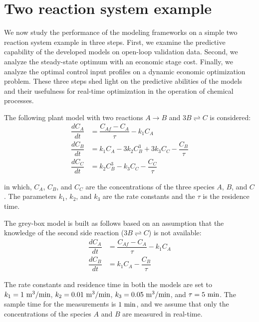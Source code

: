 \documentclass[10pt]{article}
\begin{document}
\section{Two reaction system example}

We now study the performance of the modeling frameworks on a simple two
reaction system example in three steps. First, we examine the predictive
capability of the developed models on open-loop validation data. Second, we
analyze the steady-state optimum with an economic stage cost. Finally, we
analyze the optimal control input profiles on a dynamic economic optimization
problem. These three steps shed light on the predictive abilities of the models
and their usefulness for real-time optimization in the operation of chemical
processes.

The following plant model with two reactions $A \rightarrow B$ and $3B
\rightleftharpoons C$ is considered:
\begin{align*}
  \dfrac{dC_A}{dt} &= \dfrac{C_{Af} - C_A}{\tau} - k_1C_A\\
  \dfrac{dC_B}{dt} &= k_1C_A - 3k_2C^3_B + 3k_3C_C- \dfrac{C_B}{\tau}\\
  \dfrac{dC_C}{dt} &= k_2C^3_B - k_3C_C - \dfrac{C_C}{\tau}
\end{align*}

in which, $C_A$, $C_B$, and $C_C$ are the concentrations of the three species
$A$, $B$, and $C$. The parameters $k_1$, $k_2$, and $k_3$ are the rate constants
and the $\tau$ is the residence time.

The grey-box model is built as follows based on an assumption that the knowledge
of the second side reaction ($3B \rightleftharpoons C $) is not available:
\begin{align*}
  \dfrac{dC_A}{dt} &= \dfrac{C_{Af} - C_A}{\tau} - k_1C_A\\
  \dfrac{dC_B}{dt} &= k_1C_A - \dfrac{C_B}{\tau}
\end{align*}

The rate constants and residence time in both the models are set to $k_1 = 1 \
\textnormal{m}^3/\textnormal{min}$, $k_2 = 0.01 \
\textnormal{m}^3/\textnormal{min}$, $k_3 = 0.05 \
\textnormal{m}^3/\textnormal{min}$, and $\tau = 5 \ \textnormal{min}$. The
sample time for the measurements is $1 \ \textnormal{min}$, and we assume that
only the concentrations of the species $A$ and $B$ are measured in real-time.
\end{document}
